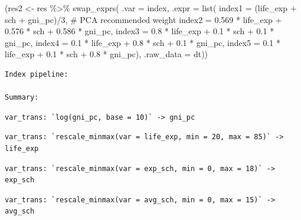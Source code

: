 \documentclass[
]{interact}
\newenvironment{Shaded}{\begin{snugshade}}{\end{snugshade}}
\newcommand{\AttributeTok}[1]{\textcolor[rgb]{0.40,0.45,0.13}{#1}}
\newcommand{\CommentTok}[1]{\textcolor[rgb]{0.37,0.37,0.37}{#1}}
\newcommand{\DecValTok}[1]{\textcolor[rgb]{0.68,0.00,0.00}{#1}}
\newcommand{\FloatTok}[1]{\textcolor[rgb]{0.68,0.00,0.00}{#1}}
\newcommand{\FunctionTok}[1]{\textcolor[rgb]{0.28,0.35,0.67}{#1}}
\newcommand{\NormalTok}[1]{\textcolor[rgb]{0.00,0.23,0.31}{#1}}
\newcommand{\OtherTok}[1]{\textcolor[rgb]{0.00,0.23,0.31}{#1}}
\newcommand{\SpecialCharTok}[1]{\textcolor[rgb]{0.37,0.37,0.37}{#1}}
\begin{document}
\begin{Shaded}
\begin{Highlighting}[]
\NormalTok{(res2 }\OtherTok{\textless{}{-}}\NormalTok{ res }\SpecialCharTok{\%\textgreater{}\%}
  \FunctionTok{swap\_exprs}\NormalTok{(}
    \AttributeTok{.var =}\NormalTok{ index,}
    \AttributeTok{.expr =} \FunctionTok{list}\NormalTok{(}
      \AttributeTok{index1 =}\NormalTok{ (life\_exp }\SpecialCharTok{+}\NormalTok{ sch }\SpecialCharTok{+}\NormalTok{ gni\_pc)}\SpecialCharTok{/}\DecValTok{3}\NormalTok{,}
      \CommentTok{\# PCA recommended weight}
      \AttributeTok{index2 =} \FloatTok{0.569} \SpecialCharTok{*}\NormalTok{ life\_exp }\SpecialCharTok{+} \FloatTok{0.576} \SpecialCharTok{*}\NormalTok{ sch }\SpecialCharTok{+} \FloatTok{0.586} \SpecialCharTok{*}\NormalTok{ gni\_pc, }
      \AttributeTok{index3 =} \FloatTok{0.8} \SpecialCharTok{*}\NormalTok{ life\_exp }\SpecialCharTok{+} \FloatTok{0.1} \SpecialCharTok{*}\NormalTok{ sch }\SpecialCharTok{+} \FloatTok{0.1} \SpecialCharTok{*}\NormalTok{ gni\_pc,}
      \AttributeTok{index4 =} \FloatTok{0.1} \SpecialCharTok{*}\NormalTok{ life\_exp }\SpecialCharTok{+} \FloatTok{0.8} \SpecialCharTok{*}\NormalTok{ sch }\SpecialCharTok{+} \FloatTok{0.1} \SpecialCharTok{*}\NormalTok{ gni\_pc,}
      \AttributeTok{index5 =} \FloatTok{0.1} \SpecialCharTok{*}\NormalTok{ life\_exp }\SpecialCharTok{+} \FloatTok{0.1} \SpecialCharTok{*}\NormalTok{ sch }\SpecialCharTok{+} \FloatTok{0.8} \SpecialCharTok{*}\NormalTok{ gni\_pc),}
    \AttributeTok{.raw\_data =}\NormalTok{ dt))}
\end{Highlighting}
\end{Shaded}

\begin{verbatim}
Index pipeline: 

Summary: 
\end{verbatim}

\begin{verbatim}
var_trans: `log(gni_pc, base = 10)` -> gni_pc
\end{verbatim}

\begin{verbatim}
var_trans: `rescale_minmax(var = life_exp, min = 20, max = 85)` ->
life_exp
\end{verbatim}

\begin{verbatim}
var_trans: `rescale_minmax(var = exp_sch, min = 0, max = 18)` ->
exp_sch
\end{verbatim}

\begin{verbatim}
var_trans: `rescale_minmax(var = avg_sch, min = 0, max = 15)` ->
avg_sch
\end{verbatim}
\end{document}
